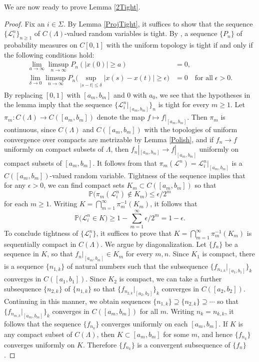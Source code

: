 We are now ready to prove Lemma \ref{2Tight}.

\begin{proof}
	
Fix an $i\in\Sigma$. By Lemma \ref{ProjTight}, it suffices to show that the sequence $\{\mathcal{L}_i^n\}_{n\geq 1}$ of $C(\Lambda)$-valued random variables is tight. By \cite[Theorem 7.3]{Billing}, a sequence $\{P_n\}$ of probability measures on $C[0,1]$ with the uniform topology is tight if and only if the following conditions hold:
\begin{align*}
\lim_{a\to\infty} \limsup_{n\to\infty} P_n(|x(0)|\geq a) &= 0, \\
\lim_{\delta\to 0} \limsup_{n\to\infty} P_n\Big(\sup_{|s-t|\leq\delta} |x(s)-x(t)| \geq \epsilon\Big) &= 0 \quad \textrm{for all}\;\epsilon>0.
\end{align*}
By replacing $[0,1]$ with $[a_m,b_m]$ and 0 with $a_0$, we see that the hypotheses in the lemma imply that the sequence $\{\mathcal{L}_i^n|_{[a_m,b_m]}\}_n$ is tight for every $m\geq 1$. Let $\pi_m : C(\Lambda) \to C([a_m,b_m])$ denote the map $f \mapsto f|_{[a_m,b_m]}$. Then $\pi_m$ is continuous, since $C(\Lambda)$ and $C([a_m,b_m])$ with the topologies of uniform convergence over compacts are metrizable by Lemma \ref{Polish}, and if $f_n\to f$ uniformly on compact subsets of $\Lambda$, then $f_n|_{[a_m,b_m]} \to f|_{[a_m,b_m]}$ uniformly on compact subsets of $[a_m,b_m]$. It follows from \cite[Theorem 1.3.5]{Durrett} that $\pi_m(\mathcal{L}^n) = \mathcal{L}_i^n|_{[a_m,b_m]}$ is a $C([a_m,b_m])$-valued random variable. Tightness of the sequence implies that for any $\epsilon > 0$, we can find compact sets $K_m\subset C([a_m,b_m])$ so that
\[
\mathbb{P}\big(\pi_m(\mathcal{L}_i^n) \notin K_m \big) \leq \epsilon/2^m
\]
for each $m\geq 1$. Writing $K = \bigcap_{m=1}^\infty \pi_m^{-1}(K_m)$, it follows that
\[
\mathbb{P}\big(\mathcal{L}^n_i \in K\big) \geq 1 - \sum_{m=1}^\infty \epsilon/2^m = 1 - \epsilon.
\]
To conclude tightness of $\{\mathcal{L}_i^n\}$, it suffices to prove that $K = \bigcap_{m=1}^\infty \pi_m^{-1}(K_m)$ is sequentially compact in $C(\Lambda)$. We argue by diagonalization. Let $\{f_n\}$ be a sequence in $K$, so that $f_n|_{[a_m,b_m]} \in K_m$ for every $m,n$. Since $K_1$ is compact, there is a sequence $\{n_{1,k}\}$ of natural numbers such that the subsequence $\{f_{n_{1,k}}|_{[a_1,b_1]}\}_k$ converges in $C([a_1,b_1])$. Since $K_2$ is compact, we can take a further subsequence $\{n_{2,k}\}$ of $\{n_{1,k}\}$ so that $\{f_{n_{2,k}}|_{[a_2,b_2]}\}_k$ converges in $C([a_2,b_2])$. Continuing in this manner, we obtain sequences $\{n_{1,k}\} \supseteq \{n_{2,k}\} \supseteq\cdots$ so that $\{f_{n_{m,k}}|_{[a_m,b_m]}\}_k$ converges in $C([a_m,b_m])$ for all $m$. Writing $n_k = n_{k,k}$, it follows that the sequence $\{f_{n_k}\}$ converges uniformly on each $[a_m,b_m]$. If $K$ is any compact subset of $C(\Lambda)$, then $K\subset [a_m,b_m]$ for some $m$, and hence $\{f_{n_k}\}$ converges uniformly on $K$. Therefore $\{f_{n_k}\}$ is a convergent subsequence of $\{f_n\}$.

\end{proof}


